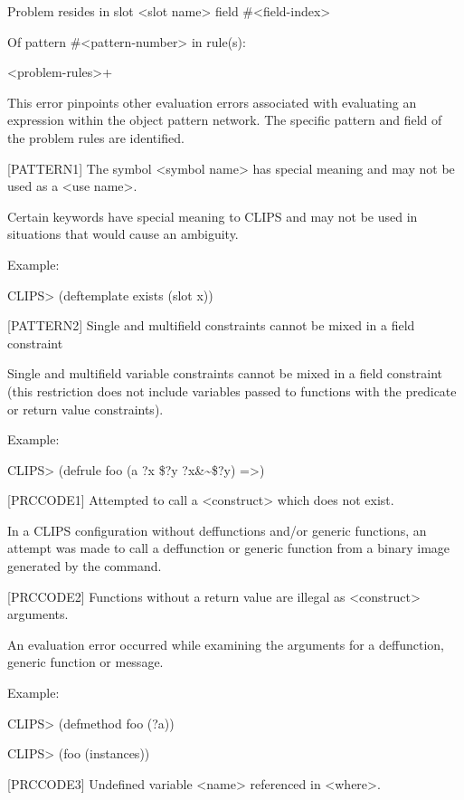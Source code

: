 \documentclass[letterpaper,10pt,english]{sphinxmanual}
\begin{document}
Problem resides in slot \textless{}slot name\textgreater{} field \#\textless{}field-index\textgreater{}

Of pattern \#\textless{}pattern-number\textgreater{} in rule(s):

\textless{}problem-rules\textgreater{}+

This error pinpoints other evaluation errors associated with evaluating
an expression within the object pattern network. The specific pattern
and field of the problem rules are identified.

{[}PATTERN1{]} The symbol \textless{}symbol name\textgreater{} has special meaning and may not be
used as a \textless{}use name\textgreater{}.

Certain keywords have special meaning to CLIPS and may not be used in
situations that would cause an ambiguity.

Example:

CLIPS\textgreater{} (deftemplate exists (slot x))

{[}PATTERN2{]} Single and multifield constraints cannot be mixed in a field
constraint

Single and multifield variable constraints cannot be mixed in a field
constraint (this restriction does not include variables passed to
functions with the predicate or return value constraints).

Example:

CLIPS\textgreater{} (defrule foo (a ?x \$?y ?x\&\textasciitilde{}\$?y) =\textgreater{})

{[}PRCCODE1{]} Attempted to call a \textless{}construct\textgreater{} which does not exist.

In a CLIPS configuration without deffunctions and/or generic functions,
an attempt was made to call a deffunction or generic function from a
binary image generated by the  command.

{[}PRCCODE2{]} Functions without a return value are illegal as \textless{}construct\textgreater{}
arguments.

An evaluation error occurred while examining the arguments for a
deffunction, generic function or message.

Example:

CLIPS\textgreater{} (defmethod foo (?a))

CLIPS\textgreater{} (foo (instances))

{[}PRCCODE3{]} Undefined variable \textless{}name\textgreater{} referenced in \textless{}where\textgreater{}.
\end{document}
